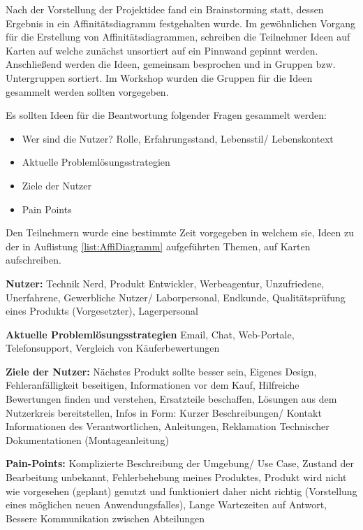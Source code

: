 Nach der Vorstellung der Projektidee fand ein Brainstorming statt, dessen Ergebnis in ein Affinitätsdiagramm festgehalten wurde. 
Im gewöhnlichen Vorgang für die Erstellung von Affinitätsdiagrammen, schreiben die Teilnehmer Ideen auf Karten auf welche zunächst unsortiert auf ein Pinnwand gepinnt werden. 
Anschließend werden die Ideen, gemeinsam besprochen und in Gruppen bzw. Untergruppen sortiert. Im Workshop wurden die Gruppen für die Ideen gesammelt werden sollten vorgegeben.  

Es sollten Ideen für die Beantwortung folgender Fragen gesammelt werden: 

\begin{itemize}
	\item Wer sind die Nutzer?
		\subitem Rolle, Erfahrungsstand,  Lebensstil/ Lebenskontext
	\item Aktuelle Problemlösungsstrategien	
	\item Ziele der Nutzer
	\item Pain Points
\end{itemize}\label{list:AffiDiagramm}

Den Teilnehmern wurde eine bestimmte Zeit vorgegeben in welchem sie, Ideen zu der in Auflistung \ref{list:AffiDiagramm} aufgeführten Themen, auf Karten aufschreiben.

\vspace{5mm}
\textbf{Nutzer: } 
Technik Nerd, Produkt Entwickler, Werbeagentur, Unzufriedene, Unerfahrene, Gewerbliche Nutzer/ Laborpersonal, Endkunde, Qualitätsprüfung eines Produkts (Vorgesetzter), Lagerpersonal

\vspace{5mm}
\textbf{Aktuelle Problemlösungsstrategien} 
Email, Chat, Web-Portale, Telefonsupport, Vergleich von Käuferbewertungen

\vspace{5mm}
\textbf{Ziele der Nutzer: } 
Nächstes Produkt sollte besser sein, Eigenes Design, Fehleranfälligkeit beseitigen, Informationen vor dem Kauf, Hilfreiche Bewertungen finden und verstehen, Ersatzteile beschaffen, Lösungen aus dem Nutzerkreis bereitstellen, Infos in Form: Kurzer Beschreibungen/ Kontakt Informationen des Verantwortlichen, Anleitungen, Reklamation Technischer Dokumentationen (Montageanleitung)

\vspace{5mm}
\textbf{Pain-Points: } 
Komplizierte Beschreibung der Umgebung/ Use Case, Zustand der Bearbeitung unbekannt, Fehlerbehebung meines Produktes, Produkt wird nicht wie vorgesehen (geplant) genutzt und funktioniert daher nicht richtig (Vorstellung eines möglichen neuen Anwendungsfalles), Lange Wartezeiten auf Antwort, Bessere Kommunikation zwischen Abteilungen

